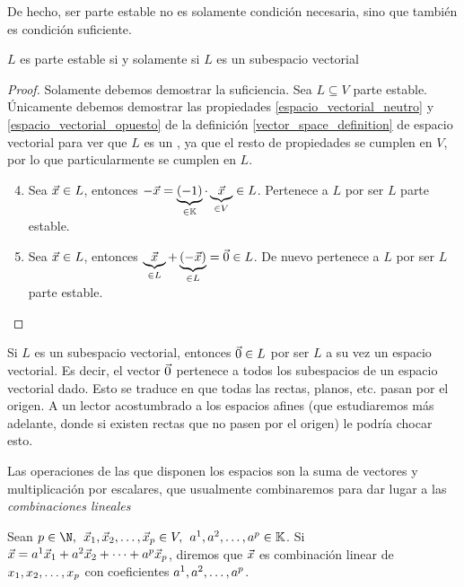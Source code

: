 \documentclass[../algebra_lineal.tex]{subfiles}
\begin{document}
De hecho, ser parte estable no es solamente condición necesaria, sino que también es condición suficiente.

\begin{proposition}
    $L$ es parte estable si y solamente si $L$ es un subespacio vectorial
\end{proposition}

\begin{proof}
    Solamente debemos demostrar la suficiencia. Sea $L \subseteq V$ parte estable. Únicamente debemos demostrar las propiedades \ref{espacio_vectorial_neutro} y \ref{espacio_vectorial_opuesto} de la definición \ref{vector_space_definition} de espacio vectorial para ver que $L$ es un \kvspace, ya que el resto de propiedades se cumplen en $V$, por lo que particularmente se cumplen en $L$.
    
    \begin{enumerate}
        \setcounter{enumi}{3}
        \item Sea $\vec{x} \in L$, entonces $-\vec{x} = \underbrace{(-1)}_{\in \mathbb{K}} \cdot \underbrace{\vec{x}}_{\in V} \in L$. Pertenece a $L$ por ser $L$ parte estable.
        \setcounter{enumi}{2}
        \item Sea $\vec{x} \in L$, entonces $\underbrace{\vec{x}}_{\in L} + \underbrace{(-\vec{x})}_{\in L} = \vec{0} \in L$. De nuevo pertenece a $L$ por ser $L$ parte estable.
    \end{enumerate}
\end{proof}

\begin{remark}
    Si $L$ es un subespacio vectorial, entonces $\vec{0} \in L$ por ser $L$ a su vez un espacio vectorial. Es decir, el vector $\vec{0}$ pertenece a todos los subespacios de un espacio vectorial dado. Esto se traduce en que todas las rectas, planos, etc. pasan por el origen. A un lector acostumbrado a los espacios afines (que estudiaremos más adelante, donde si existen rectas que no pasen por el origen) le podría chocar esto.
\end{remark}

Las operaciones de las que disponen los espacios son la suma de vectores y multiplicación por escalares, que usualmente combinaremos para dar lugar a las \textit{combinaciones lineales}

\begin{definition}
    \label{definicion_combinacion_lineal}
    Sean $p \in \N, \spc \dlst{\vx}{p} \in V, \spc \ulst{a}{p} \in \K$. Si $\vec{x} = {a}^{1}\vec{x}_{1}+{a}^{2}\vec{x}_{2}+\dots+{a}^{p}\vec{x}_{p}$, diremos que $\vec{x}$ es combinación linear de ${x}_{1}, {x}_{2}, \dots, {x}_{p}$ con coeficientes ${a}^{1}, {a}^{2}, \dots, {a}^{p}$.

\end{definition}
\end{document}
